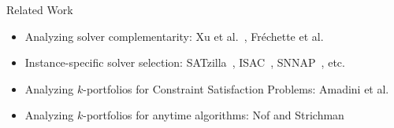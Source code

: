 \documentclass[en]{sdqbeamer}
\begin{document}
\begin{frame}[t]{Related Work}
	\begin{itemize}
		\item Analyzing solver complementarity: Xu et al.~\cite{Xu:2012:EvalContribVBS}, Fr{\'e}chette et al.~\cite{frechette2016using}
		\pause
		\vspace{\baselineskip}
		\item Instance-specific solver selection: SATzilla~\cite{xu2008satzilla, xu2012satzilla2012}, ISAC~\cite{Kadioglu:2010:ISAC}, SNNAP~\cite{Collautti:2013:SNNAP}, etc.
		\pause
		\vspace{\baselineskip}
		\item Analyzing $k$-portfolios for Constraint Satisfaction Problems: Amadini et al.~\cite{amadini2014empirical, amadini2016extensive}
		\pause
		\vspace{\baselineskip}
		\item Analyzing $k$-portfolios for anytime algorithms: Nof and Strichman~\cite{nof2020real}
	\end{itemize}
\end{frame}
\end{document}
